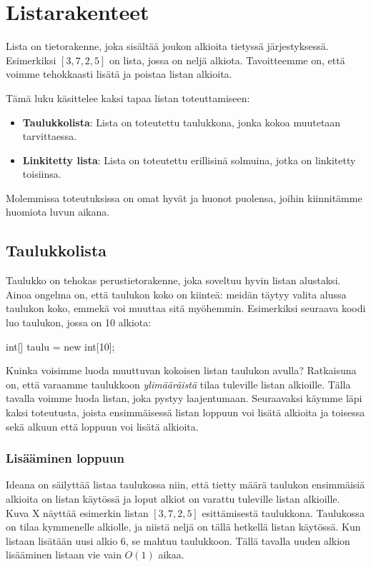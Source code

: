 \chapter{Listarakenteet}

Lista on tietorakenne, joka sisältää joukon alkioita tietyssä järjestyksessä.
Esimerkiksi $[3,7,2,5]$ on lista, jossa on neljä alkiota.
Tavoitteemme on, että voimme tehokkaasti lisätä ja poistaa listan alkioita.

Tämä luku käsittelee kaksi tapaa listan toteuttamiseen:

\begin{itemize}
\item \textbf{Taulukkolista}: Lista on toteutettu taulukkona,
jonka kokoa muutetaan tarvittaessa.
\item \textbf{Linkitetty lista}: Lista on toteutettu erillisinä solmuina,
jotka on linkitetty toisiinsa.
\end{itemize}

Molemmissa toteutuksissa on omat hyvät ja huonot puolensa,
joihin kiinnitämme huomiota luvun aikana.

\section{Taulukkolista}

Taulukko on tehokas perustietorakenne, joka soveltuu hyvin listan alustaksi.
Ainoa ongelma on, että taulukon koko on kiinteä: meidän täytyy valita
alussa taulukon koko, emmekä voi muuttaa sitä myöhemmin.
Esimerkiksi seuraava koodi luo taulukon, jossa on 10 alkiota:

\begin{code}
int[] taulu = new int[10];
\end{code}

Kuinka voisimme luoda muuttuvan kokoisen listan taulukon avulla?
Ratkaisuna on, että varaamme taulukkoon \emph{ylimääräistä}
tilaa tuleville listan alkioille.
Tälla tavalla voimme luoda listan, joka pystyy laajentumaan.
Seuraavaksi käymme läpi kaksi toteutusta,
joista ensimmäisessä listan loppuun voi lisätä alkioita
ja toisessa sekä alkuun että loppuun voi lisätä alkioita.

\subsection{Lisääminen loppuun}

Ideana on säilyttää listaa taulukossa niin,
että tietty määrä taulukon ensimmäisiä alkioita on listan käytössä
ja loput alkiot on varattu tuleville listan alkioille.
Kuva X näyttää esimerkin listan $[3,7,2,5]$ esittämisestä taulukkona.
Taulukossa on tilaa kymmenelle alkiolle, ja niistä neljä on tällä hetkellä listan käytössä.
Kun listaan lisätään uusi alkio 6, se mahtuu taulukkoon.
Tällä tavalla uuden alkion lisääminen listaan vie vain $O(1)$ aikaa.

